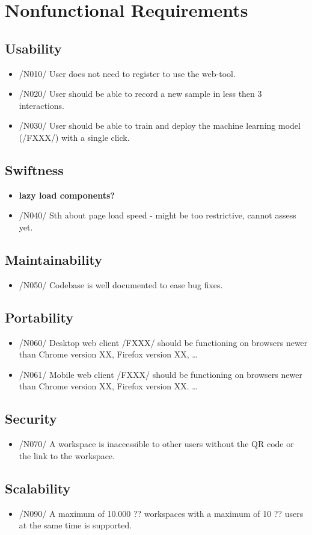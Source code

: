 \section{Nonfunctional Requirements}
\subsection{Usability}
\begin{itemize}
    \item /N010/ User does not need to register to use the web-tool.
    \item /N020/ User should be able to record a new sample in less then 3 interactions. %
    \item /N030/ User should be able to train and deploy the machine learning model (/FXXX/) with a single click. %
\end{itemize}
\subsection{Swiftness}
\begin{itemize}
    \item \textbf{lazy load components?}
    \item /N040/ Sth about page load speed - might be too restrictive, cannot assess yet. %
\end{itemize}
\subsection{Maintainability}
\begin{itemize}
    \item /N050/ Codebase is well documented to ease bug fixes.
\end{itemize}
\subsection{Portability}
\begin{itemize}
    \item /N060/ Desktop web client /FXXX/ should be functioning on browsers newer than Chrome version XX, Firefox version XX, \dots
    \item /N061/ Mobile web client /FXXX/  should be functioning on browsers newer than Chrome version XX, Firefox version XX. \dots
\end{itemize}
\subsection{Security}
\begin{itemize}
    \item /N070/ A workspace is inaccessible to other users without the QR code or the link to the workspace.
\end{itemize}
\subsection{Scalability}
\begin{itemize}
    \item /N090/ A maximum of 10.000 ?? workspaces with a maximum of 10 ?? users at the same time is supported. 
\end{itemize}

